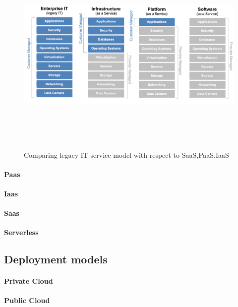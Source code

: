 \begin{figure}[h]
    \centering
    \includegraphics[height=10cm,keepaspectratio]{img/saas_paas_iaas}
    \caption{Comparing legacy IT service model with respect to SaaS,PaaS,IaaS}
    \label{fig:saas_paas_iaas}
\end{figure}

\paragraph{Paas}
\label{paragraph:Paas}
\paragraph{Iaas}
\label{paragraph:Iaas}
\paragraph{Saas}
\label{paragraph:Saas}
\paragraph{Serverless}
\label{paragraph:Serverless}

\subsection{Deployment models}
\paragraph{Private Cloud}
\label{paragraph:Private Cloud}
\paragraph{Public Cloud}
\label{paragraph:Public Cloud}

